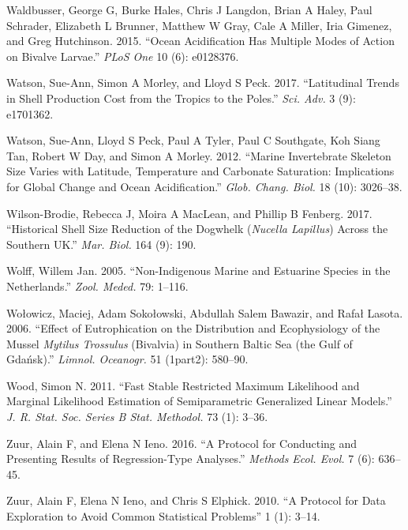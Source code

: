 \documentclass[smallextended]{svjour3}       %
\newlength{\cslhangindent}
\newenvironment{CSLReferences}[2] %
 {%
  \setlength{\parindent}{0pt}
  \ifodd #1 \everypar{\setlength{\hangindent}{\cslhangindent}}\ignorespaces\fi
  \ifnum #2 > 0
  \setlength{\parskip}{#2\baselineskip}
  \fi
 }%
 {}
\begin{document}
\begin{CSLReferences}{1}{0}
\leavevmode{}%
Waldbusser, George G, Burke Hales, Chris J Langdon, Brian A Haley, Paul
Schrader, Elizabeth L Brunner, Matthew W Gray, Cale A Miller, Iria
Gimenez, and Greg Hutchinson. 2015. {``Ocean Acidification Has Multiple
Modes of Action on Bivalve Larvae.''} \emph{PLoS One} 10 (6): e0128376.

\leavevmode{}%
Watson, Sue-Ann, Simon A Morley, and Lloyd S Peck. 2017. {``Latitudinal
Trends in Shell Production Cost from the Tropics to the Poles.''}
\emph{Sci. Adv.} 3 (9): e1701362.

\leavevmode{}%
Watson, Sue-Ann, Lloyd S Peck, Paul A Tyler, Paul C Southgate, Koh Siang
Tan, Robert W Day, and Simon A Morley. 2012. {``Marine Invertebrate
Skeleton Size Varies with Latitude, Temperature and Carbonate
Saturation: Implications for Global Change and Ocean Acidification.''}
\emph{Glob. Chang. Biol.} 18 (10): 3026--38.

\leavevmode{}%
Wilson-Brodie, Rebecca J, Moira A MacLean, and Phillip B Fenberg. 2017.
{``Historical Shell Size Reduction of the Dogwhelk (\emph{Nucella
Lapillus}) Across the Southern UK.''} \emph{Mar. Biol.} 164 (9): 190.

\leavevmode{}%
Wolff, Willem Jan. 2005. {``Non-Indigenous Marine and Estuarine Species
in the Netherlands.''} \emph{Zool. Meded.} 79: 1--116.

\leavevmode{}%
Wołowicz, Maciej, Adam Sokołowski, Abdullah Salem Bawazir, and Rafał
Lasota. 2006. {``Effect of Eutrophication on the Distribution and
Ecophysiology of the Mussel \emph{Mytilus Trossulus} (Bivalvia) in
Southern Baltic Sea (the Gulf of Gda{ń}sk).''} \emph{Limnol. Oceanogr.}
51 (1part2): 580--90.

\leavevmode{}%
Wood, Simon N. 2011. {``Fast Stable Restricted Maximum Likelihood and
Marginal Likelihood Estimation of Semiparametric Generalized Linear
Models.''} \emph{J. R. Stat. Soc. Series B Stat. Methodol.} 73 (1):
3--36.

\leavevmode{}%
Zuur, Alain F, and Elena N Ieno. 2016. {``A Protocol for Conducting and
Presenting Results of Regression-Type Analyses.''} \emph{Methods Ecol.
Evol.} 7 (6): 636--45.

\leavevmode{}%
Zuur, Alain F, Elena N Ieno, and Chris S Elphick. 2010. {``A Protocol
for Data Exploration to Avoid Common Statistical Problems''} 1 (1):
3--14.

\end{CSLReferences}




\end{document}
